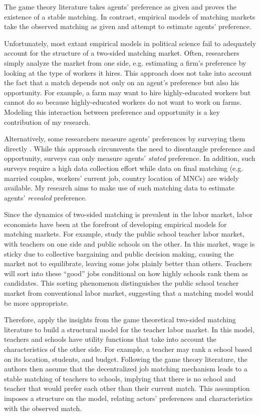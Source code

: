 The game theory literature takes agents' preference as given and proves the
existence of a stable matching. In contrast, empirical models of matching
markets take the observed matching as given and attempt to estimate agents'
preference.

Unfortunately, most extant empirical models in political science fail to
adequately account for the structure of a two-sided matching market. Often,
researchers simply analyze the market from one side, e.g. estimating a firm's
preference by looking at the type of workers it hires. This approach does not
take into account the fact that a match depends not only on an agent's
preference but also his opportunity. For example, a farm may want to hire
highly-educated workers but cannot do so because highly-educated workers do not
want to work on farms. Modeling this interaction between preference and
opportunity is a key contribution of my research.

Alternatively, some researchers measure agents' preferences by surveying them
directly \citep{Posner2001, Sprecher1994}. While this approach circumvents the
need to disentangle preference and opportunity, surveys can only measure agents'
\textit{stated} preference. In addition, such surveys require a high data
collection effort while data on final matching (e.g. married couples, workers'
current job, country location of MNCs) are widely available. My research aims to
make use of such matching data to estimate agents' \textit{revealed} preference.

Since the dynamics of two-sided matching is prevalent in the labor market, labor
economists have been at the forefront of developing empirical models for
matching markets. For example, \citet{Boyd2013} study the public school teacher
labor market, with teachers on one side and public schools on the other. In this
market, wage is sticky due to collective bargaining and public decision making,
causing the market not to equilibrate, leaving some jobs plainly better than
others. Teachers will sort into these ``good'' jobs conditional on how highly
schools rank them as candidates. This sorting phenomenon distinguishes the
public school teacher market from conventional labor market, suggesting that a
matching model would be more appropriate.

Therefore, \citet{Boyd2013} apply the insights from the game theoretical
two-sided matching literature to build a structural model for the teacher labor
market. In this model, teachers and schools have utility functions that take
into account the characteristics of the other side. For example, a teacher may rank
a school based on its location, students, and budget. Following the game theory
literature, the authors then assume that the decentralized job matching mechanism
leads to a stable matching of teachers to schools, implying that there is no
school and teacher that would prefer each other than their current match. This
assumption imposes a structure on the model, relating actors' preferences and
characteristics with the observed match.

